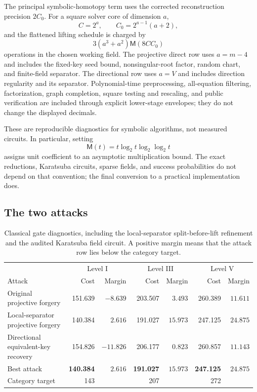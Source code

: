 \documentclass[11pt,a4paper]{article}
\theoremstyle{definition}
\theoremstyle{remark}
\newcommand{\Mmul}{\mathsf M}
\begin{document}
The principal symbolic-homotopy term uses the corrected reconstruction
precision $2C_0$.  For a square solver core of dimension $a$,
\[
 C=2^a,
 \qquad C_0=2^{a-1}(a+2),
\]
and the flattened lifting schedule is charged by
\begin{equation}\label{eq:unified-flat-cost}
 3(a^3+a^2)\Mmul(8CC_0)
\end{equation}
operations in the chosen working field.  The projective direct row uses
$a=m-4$ and includes the fixed-key seed bound, nonsingular-root factor, random
chart, and finite-field separator.  The directional row uses $a=V$ and
includes direction regularity and its separator.  Polynomial-time
preprocessing, all-equation filtering, factorization, graph completion,
square testing and rescaling, and public verification are included through
explicit lower-stage envelopes; they do not change the displayed decimals.

These are reproducible diagnostics for symbolic algorithms, not measured
circuits.  In particular, setting
\[
 \Mmul(t)=t\log_2t\log_2\log_2t
\]
assigns unit coefficient to an asymptotic multiplication bound.  The exact
reductions, Karatsuba circuits, sparse fields, and success probabilities do not
depend on that convention; the final conversion to a practical implementation
does.

\subsection{The two attacks}
\begin{table}[t]
\centering
\small
\setlength{\tabcolsep}{5pt}
\caption{Classical gate diagnostics, including the local-separator split-before-lift refinement and the audited Karatsuba field circuit.  A positive margin means that the attack row lies below the
category target.}
\label{tab:combined-costs}
\begin{tabular}{@{}lrrrrrr@{}}
\toprule
& \multicolumn{2}{c}{Level I} & \multicolumn{2}{c}{Level III} & \multicolumn{2}{c}{Level V}\\
Attack & Cost & Margin & Cost & Margin & Cost & Margin\\
\midrule
Original projective forgery
 &151.639&$-8.639$&203.507&$3.493$&260.389&$11.611$\\
Local-separator projective forgery
 &140.384&$2.616$&191.027&$15.973$&247.125&$24.875$\\
Directional equivalent-key recovery
 &154.826&$-11.826$&206.177&$0.823$&260.857&$11.143$\\
\midrule
Best attack
 &\textbf{140.384}&$\mathbf{2.616}$
 &\textbf{191.027}&$\mathbf{15.973}$
 &\textbf{247.125}&$\mathbf{24.875}$\\
\midrule
Category target &143&&207&&272&\\
\bottomrule
\end{tabular}
\end{table}
\end{document}
